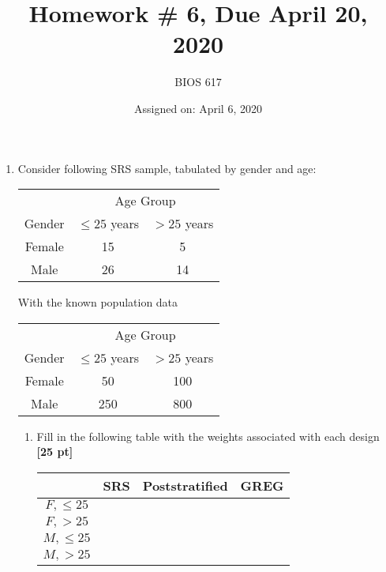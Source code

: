 \documentclass[12pt]{article}
\begin{document}
\title{Homework \# 6, Due April 20, 2020}
\author{BIOS 617}
\date{Assigned on: April 6, 2020}

\maketitle

\begin{enumerate}
\setlength{\itemsep}{15pt}%
\setlength{\parskip}{15pt}%

\item Consider following SRS sample, tabulated by gender and age:
\begin{table}[!th]
\centering
\begin{tabular}{c c c}
& \multicolumn{2}{c}{Age Group} \\ \cline{2-3}
Gender & $\leq 25$ years & $> 25$ years \\ \hline
Female & 15 & 5 \\
Male & 26 & 14 \\ \hline
\end{tabular}
\end{table}

With the known population data

\begin{table}[!th]
\centering
\begin{tabular}{c c c}
& \multicolumn{2}{c}{Age Group} \\ \cline{2-3}
Gender & $\leq 25$ years & $> 25$ years \\ \hline
Female & 50 & 100 \\
Male & 250 & 800 \\ \hline
\end{tabular}
\end{table}

\begin{enumerate}[itemsep=5ex]
	\item  Fill in the following table with the weights associated with each design {\bf [25 pt]}

	\begin{table}[!th]
	\centering
	\begin{tabular}{c | p{1in} | p{1in} | p{1in} |}
	 & SRS & Poststratified & GREG \\ \hline
	$F, \leq 25$ & & & \\
	$F, > 25$ & & & \\
	$M, \leq 25$ & & & \\
	$M, > 25$ & & & \\ \hline
	\end{tabular}
	\end{table}


\end{enumerate}
\end{enumerate}
\end{document}
